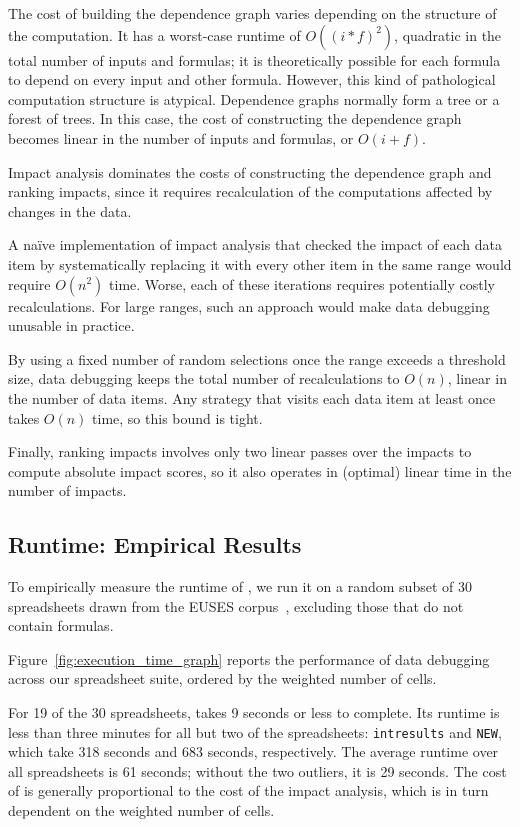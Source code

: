 The cost of building the dependence graph varies depending on the
structure of the computation. It has a worst-case runtime of
$O((i*f)^2)$, quadratic in the total number of inputs and formulas; it
is theoretically possible for each formula to depend on every input
and other formula. However, this kind of pathological computation
structure is atypical. Dependence graphs normally form a tree or a
forest of trees. In this case, the cost of constructing the dependence
graph becomes linear in the number of inputs and formulas, or
$O(i+f)$.

Impact analysis dominates the costs of constructing the dependence
graph and ranking impacts, since it requires recalculation of the
computations affected by changes in the data.

A na\"ive implementation of impact analysis that checked the impact of
each data item by systematically replacing it with every other item in
the same range would require $O(n^2)$ time. Worse, each of these
iterations requires potentially costly recalculations. For large
ranges, such an approach would make data debugging unusable in
practice.
 
By using a fixed number of random selections once the range
exceeds a threshold size, data debugging keeps the total number of
recalculations to $O(n)$, linear in the number of data items. Any
strategy that visits each data item at least once takes $O(n)$ time,
so this bound is tight.

Finally, ranking impacts involves only two linear passes over the
impacts to compute absolute impact scores, so it also operates in
(optimal) linear time in the number of impacts.

\subsection{Runtime: Empirical Results}

To empirically measure the runtime of \checkcell{}, we run it on a random subset
of 30 spreadsheets drawn from the EUSES
corpus~\cite{Fisher:2005:ESC:1082983.1083242}, excluding those that do not contain
formulas.

Figure~\ref{fig:execution_time_graph} reports the performance of data
debugging across our spreadsheet suite, ordered by the weighted number
of cells.

For 19 of the 30 spreadsheets, \checkcell{} takes 9 seconds or less to
complete. Its runtime is less than three minutes for all but two of
the spreadsheets: \texttt{intresults} and \texttt{NEW}, which take 318
seconds and 683 seconds, respectively. The average runtime over all
spreadsheets is 61 seconds; without the two outliers, it is 29
seconds. The cost of \checkcell{} is generally proportional to the
cost of the impact analysis, which is in turn dependent on the
weighted number of cells.

